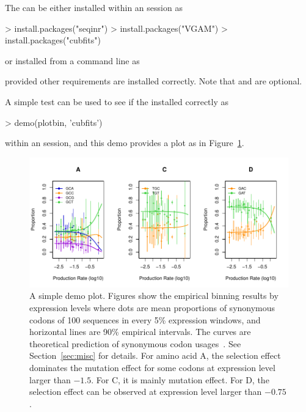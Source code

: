 The  can be either installed within an  session as
\begin{Code}
> install.packages("seqinr")
> install.packages("VGAM")
> install.packages("cubfits")
\end{Code}
or installed from a command line as
provided other requirements are installed correctly.
Note that  and  are optional.

A simple test can be used to see if the  installed correctly
as
\begin{Code}
> demo(plotbin, 'cubfits')
\end{Code}
within an  session, and this demo provides a plot as in
Figure~\ref{fig:plotbin}.
\begin{figure}[ht]
\centering
\includegraphics[width=6in]{cubfits-include/figure/plotbin}
\caption{A simple demo plot. Figures show the empirical binning results
by expression levels where dots are mean proportions of synonymous codons
of 100 sequences in every 5\% expression windows, and horizontal lines
are 90\% empirical intervals. The curves are theoretical prediction of
synonymous codon usages~\citep{Shah2011}. See Section~\ref{sec:misc} for
details.
For amino acid A, the selection effect dominates the mutation effect for
some codons at expression level larger than $-1.5$. For C,
it is mainly mutation effect. For D, the selection effect can be
observed at expression level larger than $-0.75$.
}
\label{fig:plotbin}
\end{figure}
